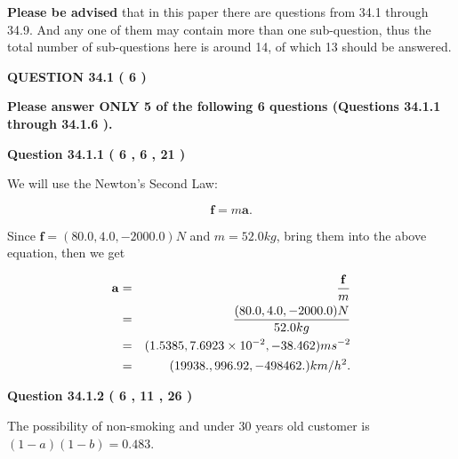 \documentclass[12pt]{article}
\begin{document}
{\textbf{\large{Please be advised}}} that in this paper there are questions from
34.1 through
34.9.
And any one of them may contain more than one sub-question, thus the total number
of sub-questions here is around 14, of which
13 should be answered.
 
\vspace{0.3in}
 
 
   
   
  
\vspace{0.2in}
  
{\textbf{\Large{QUESTION
34.1 
 (           6 )
}}}
  
  
{\textbf{\Large{Please answer ONLY  %
           5  %
 of the following  %
           6  %
 questions (Questions  %
34.1.1 %
 through  %
34.1.6 %
 ). }}}
   
   
  
\vspace{0.2in}
  
{\textbf{\Large{Question
34.1.1 
 (           6 ,           6 ,          21 )
}}}
  
  
 
 
\noindent{}

We will use the Newton's Second Law:
 
\[
\mathbf{f}=m\mathbf{a}.
\]
 
Since $\mathbf{f}=( %
80.0,  %
4.0,  %
-2000.0 )N$
and $m= %
52.0 kg$, bring them into the above equation, then we get
 
\begin{eqnarray*}
\mathbf{a}&=&\frac{\mathbf{f}}m  \\
&=&\frac{(
80.0 ,
4.0 ,
-2000.0 )N
}{ %
52.0 kg}  \\
&=&(
1.5385 ,
7.6923 \times 10^{-2},
-38.462
)ms^{-2} \\
&=&(
19938. ,
996.92 ,
-498462.
)km/h^2.
\end{eqnarray*}
 
 
 
  
\vspace{0.2in}
  
{\textbf{\Large{Question
34.1.2 
 (           6 ,          11 ,          26 )
}}}
  
  
 
 
\noindent{}

The possibility of  %
 non-smoking and  %
under 30 years old
customer is $ (1-a)(1-b) =  %
0.483 $.
 
\end{document}
